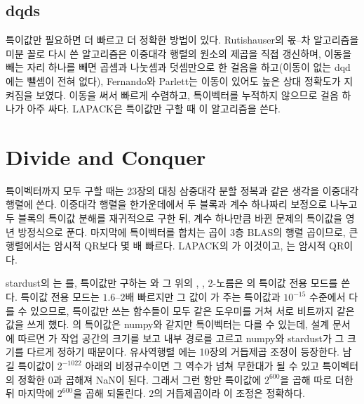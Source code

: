 \subsection{dqds}

특이값만 필요하면 더 빠르고 더 정확한 방법이 있다. Rutishauser의 몫--차 알고리즘\cite{rutishauser1954qd}을 미분 꼴로 다시 쓴  알고리즘은 이중대각 행렬의 원소의 제곱을 직접 갱신하며, 이동을 빼는 자리 하나를 빼면 곱셈과 나눗셈과 덧셈만으로 한 걸음을 하고(이동이 없는 dqd에는 뺄셈이 전혀 없다), Fernando와 Parlett는 이동이 있어도 높은 상대 정확도가 지켜짐을 보였다\cite{fernando1994dqds}. 이동을 써서 빠르게 수렴하고, 특이벡터를 누적하지 않으므로 걸음 하나가 아주 싸다. LAPACK은 특이값만 구할 때 이 알고리즘을 쓴다.

\section{Divide and Conquer}
\label{sec:svd-dc}

특이벡터까지 모두 구할 때는 23장의 대칭 삼중대각 분할 정복과 같은 생각을 이중대각 행렬에 쓴다\cite{gu1995svd}. 이중대각 행렬을 한가운데에서 두 블록과 계수 하나짜리 보정으로 나누고 두 블록의 특이값 분해를 재귀적으로 구한 뒤, 계수 하나만큼 바뀐 문제의 특이값을 영년 방정식으로 푼다. 마지막에 특이벡터를 합치는 곱이 3층 BLAS의 행렬 곱이므로, 큰 행렬에서는 암시적 QR보다 몇 배 빠르다. LAPACK의 가 이것이고, 는 암시적 QR이다.

\begin{instardust}
stardust의 는 를, 특이값만 구하는 와 그 위의 , , 2-노름은 의 특이값 전용 모드를 쓴다. 특이값 전용 모드는 $1.6$--$2$배 빠르지만 그 값이 가 주는 특이값과 $10^{-15}$ 수준에서 다를 수 있으므로, 특이값만 쓰는 함수들이 모두 같은 도우미를 거쳐 서로 비트까지 같은 값을 쓰게 했다. 의 특이값은 numpy와 같지만 특이벡터는 다를 수 있는데, 설계 문서에 따르면 가 작업 공간의 크기를 보고 내부 경로를 고르고 numpy와 stardust가 그 크기를 다르게 정하기 때문이다. 유사역행렬 에는 10장의 거듭제곱 조정이 등장한다. 남길 특이값이 $2^{-1022}$ 아래의 비정규수이면 그 역수가 넘쳐 무한대가 될 수 있고 특이벡터의 정확한 $0$과 곱해져 NaN이 된다. 그래서 그런 항만 특이값에 $2^{600}$을 곱해 따로 더한 뒤 마지막에 $2^{600}$을 곱해 되돌린다. $2$의 거듭제곱이라 이 조정은 정확하다.
\end{instardust}

